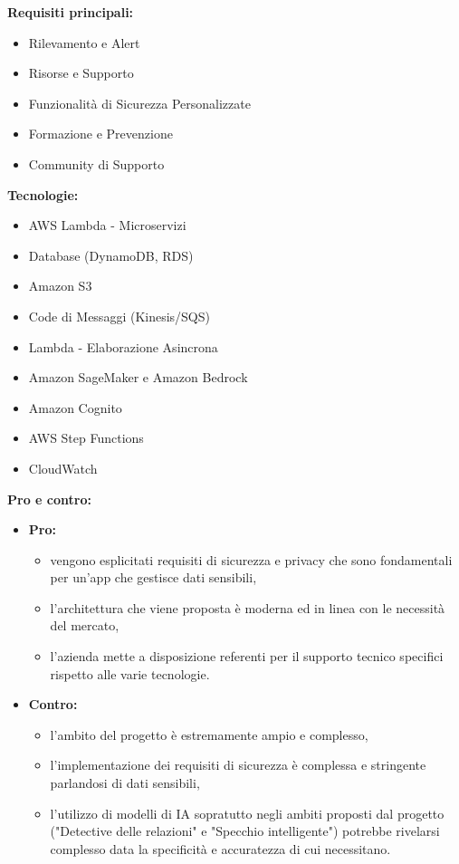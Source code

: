 \vspace{0.3cm}
\textbf{Requisiti principali:}
\begin{itemize}
	\item {Rilevamento e Alert}
	\item {Risorse e Supporto}
    \item {Funzionalità di Sicurezza Personalizzate}
    \item {Formazione e Prevenzione}
    \item {Community di Supporto}
\end{itemize}

\vspace{0.3cm}
\textbf{Tecnologie:}
\begin{itemize}
	\item {AWS Lambda - Microservizi}
    \item {Database (DynamoDB, RDS)}
    \item {Amazon S3 }
    \item {Code di Messaggi (Kinesis/SQS)}
    \item {Lambda - Elaborazione Asincrona}
    \item {Amazon SageMaker e Amazon Bedrock}
    \item {Amazon Cognito}
    \item {AWS Step Functions}
    \item {CloudWatch}
\end{itemize}

\vspace{0.3cm}
\textbf{Pro e contro:}
\begin{itemize}
	\item \textbf{Pro:} 
        \begin{itemize}
            \item vengono esplicitati requisiti di sicurezza e privacy che sono fondamentali per un'app che gestisce dati sensibili,
            \item l'architettura che viene proposta è moderna ed in linea con le necessità del mercato,
            \item l'azienda mette a disposizione referenti per il supporto tecnico specifici rispetto alle varie tecnologie.
        \end{itemize}
	\item \textbf{Contro:}
        \begin{itemize}
            \item l'ambito del progetto è estremamente ampio e complesso,
            \item l'implementazione dei requisiti di sicurezza è complessa e stringente parlandosi di dati sensibili,
            \item l'utilizzo di modelli di IA sopratutto negli ambiti proposti dal progetto ("Detective delle relazioni" e "Specchio intelligente") potrebbe rivelarsi complesso data la specificità e accuratezza di cui necessitano.
        \end{itemize}
\end{itemize}

